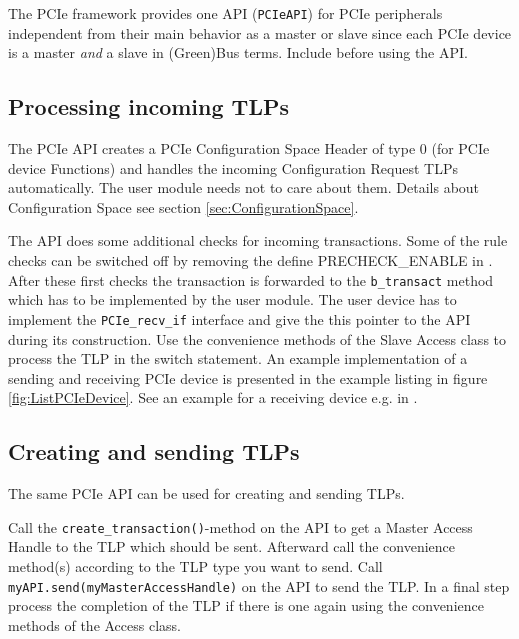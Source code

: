 The PCIe framework provides one API (\lstinline|PCIeAPI|) for PCIe peripherals independent from their main behavior as a master or slave since each PCIe device is a master \emph{and} a slave in (Green)Bus terms. Include  before using the API.


\subsection{Processing incoming TLPs}
The PCIe API creates a PCIe Configuration Space Header of type 0 (for PCIe device Functions) and handles the incoming Configuration Request TLPs automatically. The user module needs not to care about them. Details about Configuration Space see section \ref{sec:ConfigurationSpace}.

The API does some additional checks for incoming transactions. Some of the rule checks can be switched off by removing the define PRECHECK\_ENABLE in . After these first checks the transaction is forwarded to the \lstinline|b_transact| method which has to be implemented by the user module. The user device has to implement the \lstinline|PCIe_recv_if| interface and give the this pointer to the API during its construction. Use the convenience methods of the Slave Access class to process the TLP in the switch statement. An example implementation of a sending and receiving PCIe device is presented in the example listing in figure \ref{fig:ListPCIeDevice}. See an example for a receiving device e.g. in .

\subsection{Creating and sending TLPs}

The same PCIe API can be used for creating and sending TLPs.

Call the \mbox{\lstinline|create_transaction()|-}method on the API to get a Master Access Handle to the TLP which should be sent. Afterward call the convenience method(s) according to the TLP type you want to send. Call \mbox{\lstinline|myAPI.send(myMasterAccessHandle)|} on the API to send the TLP. In a final step process the completion of the TLP if there is one again using the convenience methods of the Access class.

